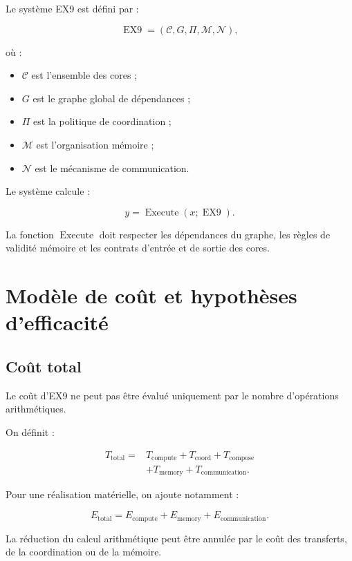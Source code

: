 \documentclass[11pt,a4paper]{article}
\begin{document}
Le système EX9 est défini par :

\[
\operatorname{EX9}
=
(\mathcal{C},G,\Pi,\mathcal{M},\mathcal{N}),
\]

où :
\begin{itemize}
  \item $\mathcal{C}$ est l'ensemble des cores ;
  \item $G$ est le graphe global de dépendances ;
  \item $\Pi$ est la politique de coordination ;
  \item $\mathcal{M}$ est l'organisation mémoire ;
  \item $\mathcal{N}$ est le mécanisme de communication.
\end{itemize}

Le système calcule :

\[
y
=
\operatorname{Execute}
\left(
x;\operatorname{EX9}
\right).
\]

La fonction $\operatorname{Execute}$ doit respecter les dépendances
du graphe, les règles de validité mémoire et les contrats d'entrée
et de sortie des cores.

\section{Modèle de coût et hypothèses d'efficacité}

\subsection{Coût total}

Le coût d'EX9 ne peut pas être évalué uniquement par le nombre
d'opérations arithmétiques.

On définit :

\[
\begin{aligned}
T_{\mathrm{total}}
={}&T_{\mathrm{compute}}
+T_{\mathrm{coord}}
+T_{\mathrm{compose}}\\
&+T_{\mathrm{memory}}
+T_{\mathrm{communication}}.
\end{aligned}
\]

Pour une réalisation matérielle, on ajoute notamment :

\[
E_{\mathrm{total}}
=
E_{\mathrm{compute}}
+E_{\mathrm{memory}}
+E_{\mathrm{communication}}.
\]

La réduction du calcul arithmétique peut être annulée par le coût
des transferts, de la coordination ou de la mémoire.
\end{document}
